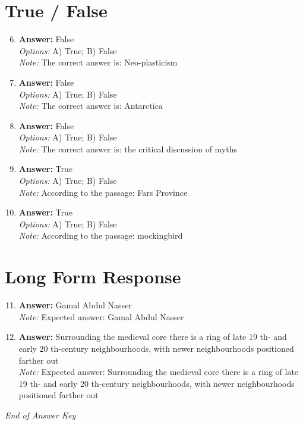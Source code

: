 \documentclass[12pt]{article}
\begin{document}
\section*{True / False}
\begin{enumerate}[label=\arabic*.]
\setcounter{enumi}{5}
\item \textbf{Answer:} False
\\ \textit{Options:} A) True; B) False
\\ \textit{Note:} The correct answer is: Neo-plasticism
\item \textbf{Answer:} False
\\ \textit{Options:} A) True; B) False
\\ \textit{Note:} The correct answer is: Antarctica
\item \textbf{Answer:} False
\\ \textit{Options:} A) True; B) False
\\ \textit{Note:} The correct answer is: the critical discussion of myths
\item \textbf{Answer:} True
\\ \textit{Options:} A) True; B) False
\\ \textit{Note:} According to the passage: Fars Province
\item \textbf{Answer:} True
\\ \textit{Options:} A) True; B) False
\\ \textit{Note:} According to the passage: mockingbird
\end{enumerate}

\section*{Long Form Response}
\begin{enumerate}[label=\arabic*.]
\setcounter{enumi}{10}
\item \textbf{Answer:} Gamal Abdul Nasser
\\ \textit{Note:} Expected answer: Gamal Abdul Nasser
\item \textbf{Answer:} Surrounding the medieval core there is a ring of late 19 th- and early 20 th-century neighbourhoods, with newer neighbourhoods positioned farther out
\\ \textit{Note:} Expected answer: Surrounding the medieval core there is a ring of late 19 th- and early 20 th-century neighbourhoods, with newer neighbourhoods positioned farther out
\end{enumerate}

\vfill
\noindent\textit{End of Answer Key}
\end{document}

